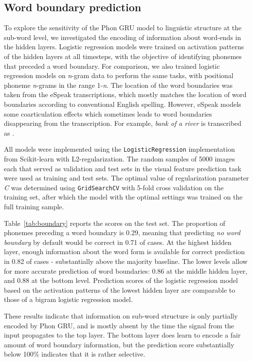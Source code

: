 
\subsection{Word boundary prediction}
To explore the sensitivity of the {\sc Phon GRU} model to linguistic structure at the sub-word level, we investigated the encoding of information about word-ends in the hidden layers. Logistic regression models were trained on activation patterns of the hidden layers at all timesteps, with the objective of identifying phonemes that preceded a word boundary. For comparison, we also trained logistic regression models on \textit{n}-gram data to perform the same tasks, with positional phoneme \textit{n}-grams in the range 1-\textit{n}. The location of the word boundaries was taken from the eSpeak transcriptions, which mostly matches the location of word boundaries according to conventional English spelling. However, eSpeak models some coarticulation effects which sometimes leads to word boundaries disappearing from the transcription. For example, {\it bank of a river} is transcribed as .

All models were implemented using the {\tt LogisticRegression} implementation from Scikit-learn \cite{scikit-learn} with L2-regularization. The random samples of 5000 images each that served as validation and test sets in the visual feature prediction task were used as training and test sets. The optimal value of regularization parameter \textit{C} was determined using {\tt GridSearchCV} with 5-fold cross validation on the training set, after which the model with the optimal settings was trained on the full training sample.

Table~\ref{tab:boundary} reports the scores on the test set. The proportion of phonemes preceding a word boundary is 0.29, meaning that predicting {\it no word boundary} by default would be correct in 0.71 of cases. At the highest hidden layer, enough information about the word form is available for correct prediction in 0.82 of cases - substantially above the majority baseline. The lower levels allow for more accurate prediction of word boundaries: 0.86 at the middle hidden layer, and 0.88 at the bottom level.
Prediction scores of the logistic regression model based on the activation patterns of the lowest hidden layer are comparable to those of a bigram logistic regression model.

These results indicate that information on sub-word structure is only partially encoded by {\sc Phon GRU}, and is mostly absent by the time the signal from the input propagates to the top layer. The bottom layer does learn to encode a fair amount of word boundary information, but the prediction score substantially below 100\% indicates that it is rather selective. 

